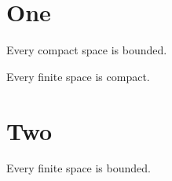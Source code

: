 \documentclass[a4paper]{proceedings}
\begin{document}
\section{One}
\begin{theorem} Every compact space is bounded. \end{theorem}
\begin{lemma} Every finite space is compact. \end{lemma}
\section{Two}
\begin{theorem} Every finite space is bounded. \end{theorem}
\end{document}
